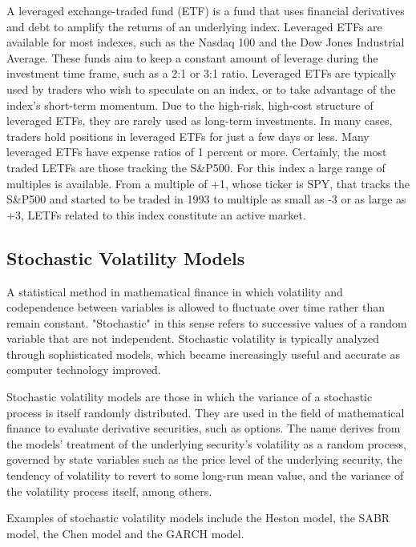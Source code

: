 \documentclass{article}
\begin{document}
A leveraged exchange-traded fund (ETF) is a fund that uses financial derivatives and debt to amplify the returns of an underlying index. Leveraged ETFs are available for most indexes, such as the Nasdaq 100 and the Dow Jones Industrial Average. These funds aim to keep a constant amount of leverage during the investment time frame, such as a 2:1 or 3:1 ratio. Leveraged ETFs are typically used by traders who wish to speculate on an index, or to take advantage of the index's short-term momentum. Due to the high-risk, high-cost structure of leveraged ETFs, they are rarely used as long-term investments. In many cases, traders hold positions in leveraged ETFs for just a few days or less. Many leveraged ETFs have expense ratios of 1 percent or more.\citep{ref5}
Certainly, the most traded LETFs are those tracking the S&P500. For this index a large range of multiples is available. From a multiple of +1, whose ticker is SPY, that tracks the S&P500 and started to be traded in 1993 to multiple as small as -3 or as large as +3, LETFs related to this index constitute an active market. \citep{ref3}


\subsection{Stochastic Volatility Models}
A statistical method in mathematical finance in which volatility and codependence between variables is allowed to fluctuate over time rather than remain constant. "Stochastic" in this sense refers to successive values of a random variable that are not independent. Stochastic volatility is typically analyzed through sophisticated models, which became increasingly useful and accurate as computer technology improved. \citep{ref8}
\newline

Stochastic volatility models are those in which the variance of a stochastic process is itself randomly distributed. They are used in the field of mathematical finance to evaluate derivative securities, such as options. The name derives from the models' treatment of the underlying security's volatility as a random process, governed by state variables such as the price level of the underlying security, the tendency of volatility to revert to some long-run mean value, and the variance of the volatility process itself, among others. \citep{ref7}
\newline

Examples of stochastic volatility models include the Heston model, the SABR model, the Chen model and the GARCH model.
\end{document}

